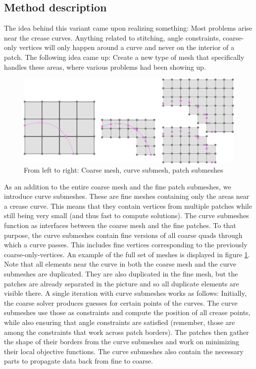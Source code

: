 \documentclass[a4paper,twoside,12pt,nochapterprefix]{scrbook}
\begin{document}
\subsection{Method description}
The idea behind this variant came upon realizing something: Most problems arise near the crease curves. Anything related to stitching, angle constraints, coarse-only vertices will only happen around a curve and never on the interior of a patch. The following idea came up: Create a new type of mesh that specifically handles these areas, where various problems had been showing up.\newline
\begin{figure}
    \centering
    \includegraphics[width=0.99\linewidth]{figures/0306_curvesubmesh}
    \caption{From left to right: Coarse mesh, curve submesh, patch submeshes}
      \label{fig:curve_submesh}
\end{figure}
As an addition to the entire coarse mesh and the fine patch submeshes, we introduce curve submeshes. These are fine meshes containing only the areas near a crease curve. This means that they contain vertices from multiple patches while still being very small (and thus fast to compute solutions). The curve submeshes function as interfaces between the coarse mesh and the fine patches. To that purpose, the curve submeshes contain fine versions of all coarse quads through which a curve passes. This includes fine vertices corresponding to the previously coarse-only-vertices. An example of the full set of meshes is displayed in figure \ref{fig:curve_submesh}. Note that all elements near the curve in both the coarse mesh and the curve submeshes are duplicated. They are also duplicated in the fine mesh, but the patches are already separated in the picture and so all duplicate elements are visible there.\newline
A single iteration with curve submeshes works as follows: Initially, the coarse solver produces guesses for certain points of the curves. The curve submeshes use those as constraints and compute the position of all crease points, while also ensuring that angle constraints are satisfied (remember, those are among the constraints that work across patch borders). The patches then gather the shape of their borders from the curve submeshes and work on minimizing their local objective functions. The curve submeshes also contain the necessary parts to propagate data back from fine to coarse.\newline
\end{document}
